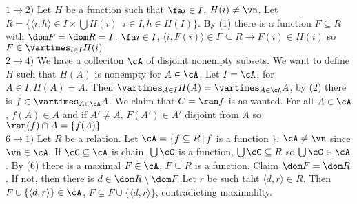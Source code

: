 \begin{pf}
    $1 \to 2)$ Let $H$ be a function such that $\fa i \in I$, $H(i) \neq \vn$. Let $R = \{ \langle i, h \rangle \in I \times \bigcup H(i) \, \ \, i \in I, h \in H(I)\}$. By (1) there is a function $F \subseteq R$ with $\dom F = \dom R = I$. $\fa i \in I$, $\langle i, F(i) \rangle \in F \subseteq R \to F(i) \in H(i)$ so $F \in \vartimes_{i \in I}H(i)$ \\
    $2 \to 4)$ We have a colleciton $\cA$ of disjoint nonempty subsets. We want to define $H$ such that $H(A)$ is nonempty for $A \in \cA$. Let $I = \cA$, for $A \in I, H(A)=A$. Then $\vartimes_{A \in I}H(A) = \vartimes_{A \in \cA}A$, by (2) there is $f \in \vartimes_{A \in \cA}A$. We claim that $C = \ran f$ is as wanted. For all $A \in \cA$, $f(A) \in A$ and if $A' \neq A$, $F(A') \in A'$ disjoint from $A$ so $\ran (f) \cap A = \{f(A)\}$ \\ 
    $6 \to 1)$ Let $R$ be a relation. Let $\cA = \{ f \subseteq R \, | \, f$ is a function $\}$. $\cA \neq \vn$ since $\vn \in \cA$. If $\cC \subseteq \cA$ is chain, $\bigcup \cC$ is a function, $\bigcup \cC \subseteq R$ so $\bigcup \cC \in \cA$. By (6) there is a maximal $F \in \cA$, $F \subseteq R$ is a function. Claim $\dom F = \dom R$. If not, then there is $d \in \dom R \setminus \dom F$.Let $r$ be such taht $\langle d, r \rangle \in R$. Then $F \cup \{ \langle d, r \rangle \}\in \cA$, $F \subsetneq F \cup \{ \langle d, r \rangle\}$, contradicting maximalilty. 
\end{pf}
